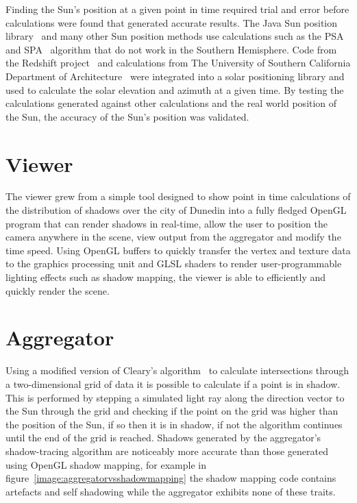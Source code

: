 \documentclass[12pt]{report}
\newcommand{\note}[1]{}
\begin{document}
Finding the Sun's position at a given point in time required trial and error before calculations were found that generated accurate results. The Java Sun position library~\cite{javasunlib} and many other Sun position methods use calculations such as the PSA~\cite{psa} and SPA~\cite{spa} algorithm that do not work in the Southern Hemisphere\cite{southsun}. Code from the Redshift project~\cite{redshift} and calculations from The University of Southern California Department of Architecture~\cite{solarazi} were integrated into a solar positioning library and used to calculate the solar elevation and azimuth at a given time. By testing the calculations generated against other calculations and the real world position of the Sun, the accuracy of the Sun's position was validated.


\section{Viewer}\note{Should I change these headings?}
The viewer grew from a simple tool designed to show point in time calculations of the distribution of shadows over the city of Dunedin into a fully fledged OpenGL program that can render shadows in real-time, allow the user to position the camera anywhere in the scene, view output from the aggregator and modify the time speed. Using OpenGL buffers to quickly transfer the vertex and texture data to the graphics processing unit and GLSL shaders to render user-programmable lighting effects such as shadow mapping, the viewer is able to efficiently and quickly render the scene.

\section{Aggregator}
Using a modified version of Cleary's algorithm~\cite{cleary} to calculate intersections through a two-dimensional grid of data it is possible to calculate if a point is in shadow. This is performed by stepping a simulated light ray along the direction vector to the Sun through the grid and checking if the point on the grid was higher than the position of the Sun, if so then it is in shadow, if not the algorithm continues until the end of the grid is reached. Shadows generated by the aggregator's shadow-tracing algorithm are noticeably more accurate than those generated using OpenGL shadow mapping, for example in figure~\ref{image:aggregatorvsshadowmapping} the shadow mapping code contains artefacts and self shadowing while the aggregator exhibits none of these traits.
\end{document}
